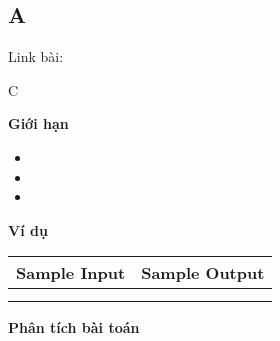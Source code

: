 \subsection{A}
Link bài: \url{}

\begin{tcolorbox}[
    colback=blue!5,        %
    colframe=blue!75!black,%
    title={Đề bài}
]
C
\end{tcolorbox}

\textbf{Giới hạn}
\begin{itemize}
    \item 
    \item 
    \item 
\end{itemize}

\textbf{Ví dụ}

\begin{table}[h]
    \centering
    \begin{tabular}{|l|r|}
        \hline
        \textbf{Sample Input} & \textbf{Sample Output} \\
        \hline
		& \\ 
		&  \\ 
		\hline
    \end{tabular}
\end{table}

\textbf{Phân tích bài toán}